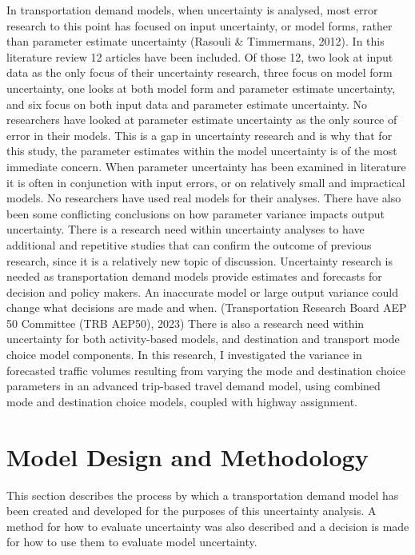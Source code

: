 \documentclass[fancy, masters]{byuthesis}
\begin{document}
In transportation demand models, when uncertainty is analysed, most error research to this point has focused on input uncertainty, or model forms, rather than parameter estimate uncertainty (Rasouli \& Timmermans, 2012). In this literature review 12 articles have been included. Of those 12, two look at input data as the only focus of their uncertainty research, three focus on model form uncertainty, one looks at both model form and parameter estimate uncertainty, and six focus on both input data and parameter estimate uncertainty. No researchers have looked at parameter estimate uncertainty as the only source of error in their models. This is a gap in uncertainty research and is why that for this study, the parameter estimates within the model uncertainty is of the most immediate concern. When parameter uncertainty has been examined in literature it is often in conjunction with input errors, or on relatively small and impractical models. No researchers have used real models for their analyses. There have also been some conflicting conclusions on how parameter variance impacts output uncertainty. There is a research need within uncertainty analyses to have additional and repetitive studies that can confirm the outcome of previous research, since it is a relatively new topic of discussion. Uncertainty research is needed as transportation demand models provide estimates and forecasts for decision and policy makers. An inaccurate model or large output variance could change what decisions are made and when. (Transportation Research Board AEP 50 Committee (TRB AEP50), 2023) There is also a research need within uncertainty for both activity-based models, and destination and transport mode choice model components. In this research, I investigated the variance in forecasted traffic volumes resulting from varying the mode and destination choice parameters in an advanced trip-based travel demand model, using combined mode and destination choice models, coupled with highway assignment.

\hypertarget{model-design-and-methodology}{%
\chapter{Model Design and Methodology}\label{model-design-and-methodology}}

This section describes the process by which a transportation demand model has been created and developed for the purposes of this uncertainty analysis. A method for how to evaluate uncertainty was also described and a decision is made for how to use them to evaluate model uncertainty.
\end{document}
